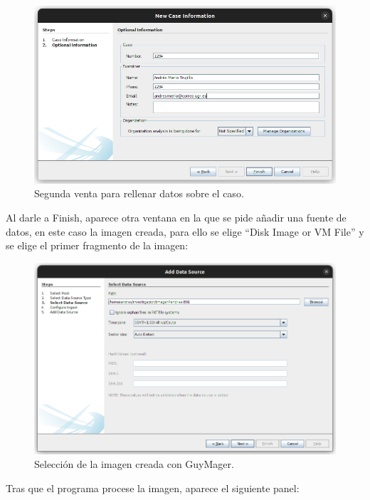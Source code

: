 \documentclass{article}
\begin{document}
\begin{figure}[H]
    \centering
    \includegraphics[width=\textwidth]{imagenes/Captura desde 2022-12-03 21-43-15.png}
    \caption{Segunda venta para rellenar datos sobre el caso.}
\end{figure}

\newpage

Al darle a Finish, aparece otra ventana en la que se pide añadir una fuente de datos, en este caso la imagen creada, para ello se elige ``Disk Image or VM File'' y se elige el primer fragmento de la imagen:

\begin{figure}[H]
    \centering
    \includegraphics[width=\textwidth]{imagenes/Captura desde 2022-12-03 21-45-13.png}
    \caption{Selección de la imagen creada con GuyMager.}
\end{figure}

Tras que el programa procese la imagen, aparece el siguiente panel:
\end{document}
